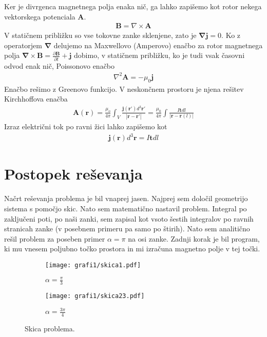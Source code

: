 \documentclass[12pt, a4paper]{article}
\begin{document}
Ker je divrgenca magnetnega polja enaka nič, ga lahko zapišemo kot rotor nekega vektorskega potenciala $\mathbf{A}$.
\begin{eqnarray}
  \mathbf{B} = \nabla \times \mathbf{A}
\end{eqnarray}
V statičnem približku so vse tokovne zanke sklenjene, zato je $\mathbf{\nabla}\mathbf{j} = 0$. Ko z operatorjem $\mathbf{\nabla}$ delujemo na Maxwellovo (Amperovo) enačbo za rotor magnetnega polja $\mathbf{\nabla} \times \mathbf{B} = \frac{\partial \mathbf{B}}{\partial t} + \mathbf{j}$ dobimo, v statičnem približku, ko je tudi vsak časovni odvod enak nič, Poissonovo enačbo
\begin{eqnarray}
  \nabla^2 \mathbf{A} = - \mu_0 \mathbf{j}
\end{eqnarray}
Enačbo rešimo z Greenovo funkcijo. V neskončnem prostoru je njena rešitev Kirchhoffova enačba
\begin{eqnarray}
  \label{eq:vektpotencial}
  \mathbf{A}(\mathbf{r}) = \frac{\mu_o}{4\pi}\int_V \frac{\mathbf{j}(\mathbf{r'}) d^3 \mathbf{r'}}{ |\mathbf{r - r'}| } = \frac{\mu_0}{4 \pi} \int \frac{I \mathbf{t} dl}{|\mathbf{r} - \mathbf{r}(l)|}
\end{eqnarray}
Izraz električni tok po ravni žici lahko zapišemo kot
\begin{eqnarray}
  \mathbf{j(r)}d^3\mathbf{r} = I \mathbf{t} dl
\end{eqnarray}


\section{Postopek reševanja}

Načrt reševanja problema je bil vnaprej jasen. Najprej sem določil geometrijo sistema s pomočjo skic. Nato sem matematično nastavil problem. Integral po zaključeni poti, po naši zanki, sem zapisal kot vsoto šestih integralov po ravnih stranicah zanke (v posebnem primeru pa samo po štirih). Nato sem analitično rešil problem za poseben primer $\alpha = \pi$ na osi zanke.
Zadnji korak je bil program, ki mu vnesem poljubno točko prostora in mi izračuna magnetno polje v tej točki.

\begin{figure}[h]
  \centering
  \begin{subfigure}[b]{0.45\textwidth}
    \centering
    \texttt{[image: grafi1/skica1.pdf]}
    \caption{$\alpha = \frac{\pi}{3}$}
    \label{graf}
  \end{subfigure}
  \begin{subfigure}[b]{0.45\textwidth}
    \centering
    \texttt{[image: grafi1/skica23.pdf]}
    \caption{$\alpha = \frac{3\pi}{4}$}
    \label{graf}
  \end{subfigure}
  \caption{Skica problema.}
\end{figure}
\end{document}
